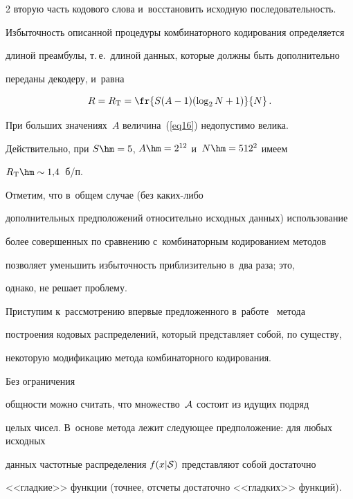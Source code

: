 \begin{multicols}{2}
вторую часть кодового слова и~восстановить исходную последовательность.



Избыточность описанной процедуры комбинаторного кодирования определяется 

длиной преамбулы, т.\,е.\ длиной данных, которые должны быть дополнительно 

переданы декодеру, и~равна

\begin{equation}

\label{eq16}

R = R_{\mathrm{T}} = \fr{S(A-1)(\log_{2}N+1)}{N}\,.

\end{equation}

При больших значениях~$A$ величина~(\ref{eq16}) не\-до\-пус\-ти\-мо велика. 

Действительно, при $S\hm=5$, $A\hm=2^{12}$ и~$N\hm=512^2$ имеем 

$R_{\mathrm{T}}\hm\sim1{,}4$~б/п.



Отметим, что в~общем случае (без ка\-ких-ли\-бо 

дополнительных предположений относительно исходных данных) использование 

более совершенных по сравнению с~комбинаторным кодированием методов 

позволяет уменьшить избыточность приблизительно в~два раза; это, 

однако, не решает проблему.



Приступим к~рассмотрению впервые предложенного в~работе~\cite{b01} метода 

построения кодовых распределений, который представляет собой, по существу, 

некоторую модификацию метода комбинаторного кодирования.



 Без ограничения 

общности можно считать, что множество~${\cal A}$ состоит из идущих подряд 

целых чисел. В~основе метода лежит следующее предположение: для любых исходных 

данных частотные распределения $f(x|{\cal S})$ представляют собой достаточно 

<<гладкие>> функции (точнее, отсчеты достаточно <<гладких>> функций). 






\end{multicols}
